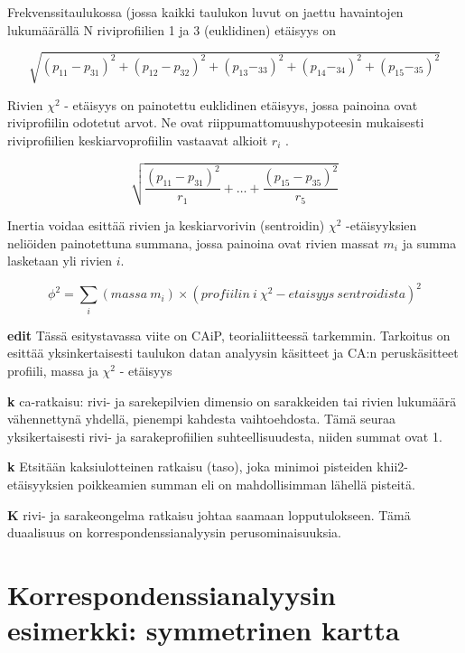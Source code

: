 \documentclass[
  finnish,
]{book}
\begin{document}
Frekvenssitaulukossa (jossa kaikki taulukon luvut on jaettu havaintojen
lukumäärällä N riviprofiilien 1 ja 3 (euklidinen) etäisyys on

\begin{equation}
 \sqrt{(p_{11} - p_{31})^2 + (p_{12} - p_{32})^2 + (p_{13} - _{33})^2+ (p_{14} - _{34})^2+ (p_{15} - _{35})^2}
 \label{eq:euclid1}
 \end{equation}

Rivien \(\chi^{2}\) - etäisyys on painotettu euklidinen etäisyys, jossa painoina
ovat riviprofiilin odotetut arvot. Ne ovat riippumattomuushypoteesin mukaisesti
riviprofiilien keskiarvoprofiilin vastaavat alkioit \(r_{i}\) .

\begin{equation}
 \sqrt{\frac{(p_{11} - p_{31})^2} { r_{1}} + \dots + \frac{(p_{15} - p_{35})^2} {r_{5}}}
 \label{eq:euclid2}
\end{equation}

Inertia voidaa esittää rivien ja keskiarvorivin (sentroidin) \(\chi^{2}\) -etäisyyksien
neliöiden painotettuna summana, jossa painoina ovat rivien massat \(m_{i}\) ja
summa lasketaan yli rivien \({i}\).

\begin{equation}
 \phi^{2} = \sum_{i} (massa \: m_{i}) \times (profiilin \: i \: \chi^{2} - etaisyys \: sentroidista)^{2}
 \label{eq:inert2}
\end{equation}

\textbf{edit} Tässä esitystavassa viite on CAiP, teorialiitteessä tarkemmin. Tarkoitus on esittää
yksinkertaisesti taulukon datan analyysin käsitteet ja CA:n peruskäsitteet profiili,
massa ja \(\chi^{2}\) - etäisyys

\textbf{k} ca-ratkaisu: rivi- ja sarekepilvien dimensio on sarakkeiden tai rivien
lukumäärä vähennettynä yhdellä, pienempi kahdesta vaihtoehdosta. Tämä seuraa
yksikertaisesti rivi- ja sarakeprofiilien suhteellisuudesta, niiden summat ovat 1.

\textbf{k} Etsitään kaksiulotteinen ratkaisu (taso), joka minimoi pisteiden
khii2-etäisyyksien poikkeamien summan eli on mahdollisimman lähellä pisteitä.

\textbf{K} rivi- ja sarakeongelma ratkaisu johtaa saamaan lopputulokseen. Tämä
duaalisuus on korrespondenssianalyysin perusominaisuuksia.

\hypertarget{korrespondenssianalyysin-esimerkki-symmetrinen-kartta}{%
\section{Korrespondenssianalyysin esimerkki: symmetrinen kartta}\label{korrespondenssianalyysin-esimerkki-symmetrinen-kartta}}
\end{document}
